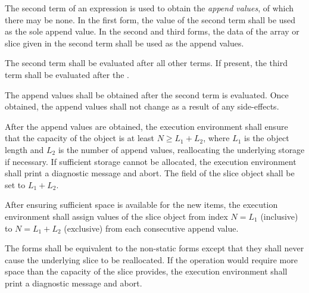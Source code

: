 \specsubsubitem
The second term of an  expression is used to obtain the
\textit{append values}, of which there may be none. In the first form, the
value of the second term shall be used as the sole append value. In the second
and third forms, the data of the array or slice given in the second term shall
be used as the append values.

\specsubsubitem
The second term shall be evaluated after all other terms. If present, the third
term shall be evaluated after the .

\specsubsubitem
The append values shall be obtained after the second term is evaluated. Once
obtained, the append values shall not change as a result of any side-effects.

\specsubsubitem
After the append values are obtained, the execution environment shall ensure
that the capacity of the object is at least $N \geq L_1 + L_2$, where $L_1$ is
the object length and $L_2$ is the number of append values, reallocating the
underlying storage if necessary. If sufficient storage cannot be allocated, the
execution environment shall print a diagnostic message and abort. The
 field of the slice object shall be set to $L_1 + L_2$.

\specsubsubitem
After ensuring sufficient space is available for the new items, the execution
environment shall assign values of the slice object from index $N = L_1$
(inclusive) to $N = L_1 + L_2$ (exclusive) from each consecutive append value.

\specsubsubitem
The  forms shall be equivalent to the non-static forms except
that they shall never cause the underlying slice to be reallocated. If the
operation would require more space than the capacity of the slice provides, the
execution environment shall print a diagnostic message and abort.


\begin{grammar}
 \\
	  \terminal{(}  \terminal{,}  \terminal{)} \\
	  \terminal{(}  \terminal{,}   \terminal{)} \\
\end{grammar}

